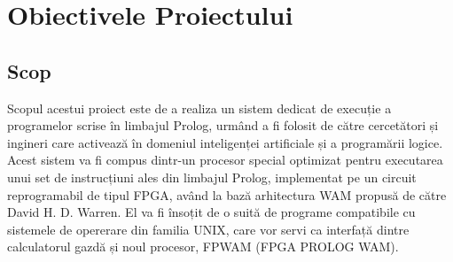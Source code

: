 \documentclass[12pt,a4paper,twoside]{report}
\begin{document}
%
%
%
%
%

\chapter{Obiectivele Proiectului}
\section{Scop}
Scopul acestui proiect este de a realiza un sistem dedicat de execuție a programelor scrise în limbajul Prolog, urmând a fi folosit de către cercetători și ingineri care activează în domeniul inteligenței artificiale și a programării logice. Acest sistem va fi compus dintr-un procesor special optimizat pentru executarea unui set de instrucțiuni ales din limbajul Prolog, implementat pe un circuit reprogramabil de tipul FPGA, având la bază arhitectura WAM propusă de către David H. D. Warren. El va fi însoțit de o suită de programe compatibile cu sistemele de opererare din familia UNIX, care vor servi ca interfață dintre calculatorul gazdă și noul procesor, FPWAM (FPGA PROLOG WAM).
\end{document}
